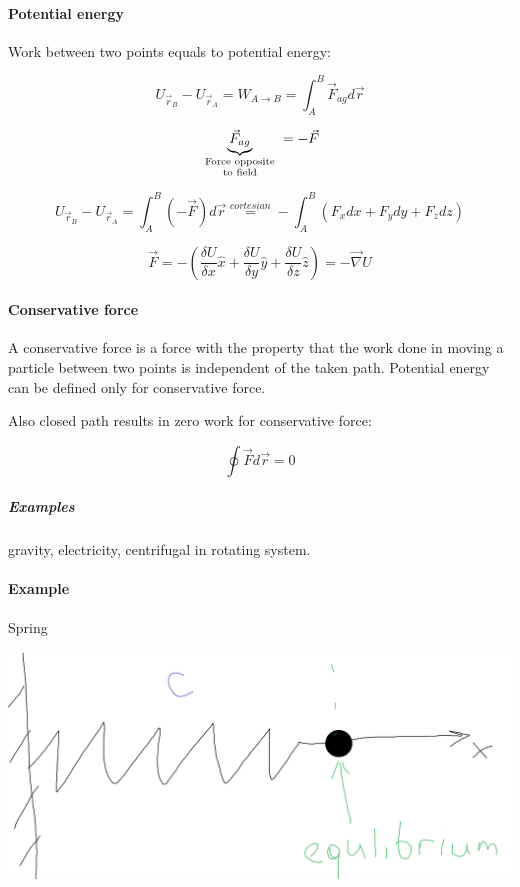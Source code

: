 \paragraph{Potential energy}
Work between two points equals to potential energy:

$$U_{\vec{r}_B}-U_{\vec{r}_A} = W_{A \to B} = \int_{A}^{B} \vec{F}_{ag} d\vec{r} $$

$$\underbrace{\vec{F}_{ag}}_{\parbox{2cm}{\centering \scriptsize Force opposite to field}} = -\vec{F}$$

$$U_{\vec{r}_B}-U_{\vec{r}_A} = \int_{A}^{B} \left(-\vec{F}\right) d\vec{r} \stackrel{cortesian}{=} -\int_A^B \left( F_x dx + F_y dy + F_z dz \right) $$

$$\vec{F} = -\left( \frac{\delta U}{\delta x}\hat{x} + \frac{\delta U}{\delta y}\hat{y} + \frac{\delta U}{\delta z}\hat{z} \right) = - \vec{\nabla} U$$

\paragraph{Conservative force} A conservative force is a force with the property that the work done in moving a particle between two points is independent of the taken path. Potential energy can be defined only for conservative force.

Also closed path results in zero work for conservative force:

$$\oint \vec{F} d\vec{r} = 0$$

\subparagraph{Examples} gravity, electricity, centrifugal in rotating system.

\paragraph{Example} Spring


\begin{center}
	\includegraphics[width=\linewidth]{./lect10/pic2.png}
\end{center}

